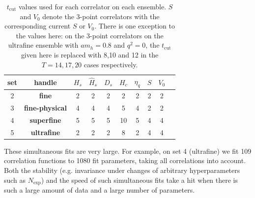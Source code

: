 \begin{table}[htb!]
  \begin{center}
    \begin{tabular}{c c c c c c c c c c}
      \hline
      set & handle & $H_s$ & $\hat{H}_s$ & $D_s$ & $H_c$ & $\eta_q$ & $S$ & $V_0$
      \\ [0.5ex]
      \hline
      2 & \bf{fine} & 2 & 2 & 2 & 2 & 2 & 2 & 2
      \\ [1ex]
      3 & \bf{fine-physical} & 4 & 4 & 4 & 5 & 4 & 2 & 2
      \\ [1ex]
      4 & \bf{superfine} & 5 & 5 & 5 & 10 & 5 & 4 & 4
      \\ [1ex]
      5 & \bf{ultrafine} & 2 & 2 & 2 & 8 & 2 & 4 & 4
      \\ [1ex]
      \hline
    \end{tabular}
  \end{center}
  \caption{$t_{\text{cut}}$ values used for each correlator on each ensemble. $S$ and $V_0$ denote the 3-point correlators with the corresponding current $S$ or $V_0$. There is one exception to the values here: on the 3-point correlators on the ultrafine ensemble with $am_h=0.8$ and $q^2=0$, the $t_{\text{cut}}$ given here is replaced with 8,10 and 12 in the $T=14,17,20$ cases respectively. \label{tab:tcuts}}
  \end{table}

These simultaneous fits are very large. For example, on set 4 (ultrafine) we fit 109 correlation functions to 1080 fit parameters, taking all correlations into account. Both the stability (e.g. invariance under changes of arbitrary hyperparameters such as $N_{\text{exp}}$) and the speed of such simultaneous fits take a hit when there is such a large amount of data and a large number of parameters.

